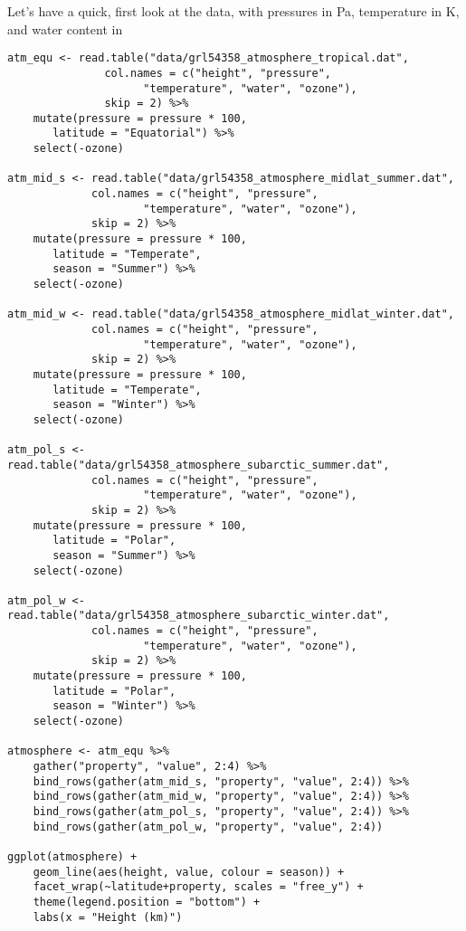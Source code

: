 \documentclass[10pt,a4paper,titlepage]{article}
\begin{document}
Let's have a quick, first look at the data, with pressures in Pa,
temperature in K, and water content in \gram\per\metre\cubed
{}
\begin{lstlisting}
atm_equ <- read.table("data/grl54358_atmosphere_tropical.dat",
		       col.names = c("height", "pressure",
				     "temperature", "water", "ozone"),
		       skip = 2) %>%
    mutate(pressure = pressure * 100,
	   latitude = "Equatorial") %>%
    select(-ozone)

atm_mid_s <- read.table("data/grl54358_atmosphere_midlat_summer.dat",
			 col.names = c("height", "pressure",
				     "temperature", "water", "ozone"),
			 skip = 2) %>%
    mutate(pressure = pressure * 100,
	   latitude = "Temperate",
	   season = "Summer") %>%
    select(-ozone)

atm_mid_w <- read.table("data/grl54358_atmosphere_midlat_winter.dat",
			 col.names = c("height", "pressure",
				     "temperature", "water", "ozone"),
			 skip = 2) %>%
    mutate(pressure = pressure * 100,
	   latitude = "Temperate",
	   season = "Winter") %>%
    select(-ozone)

atm_pol_s <- read.table("data/grl54358_atmosphere_subarctic_summer.dat",
			 col.names = c("height", "pressure",
				     "temperature", "water", "ozone"),
			 skip = 2) %>%
    mutate(pressure = pressure * 100,
	   latitude = "Polar",
	   season = "Summer") %>%
    select(-ozone)

atm_pol_w <- read.table("data/grl54358_atmosphere_subarctic_winter.dat",
			 col.names = c("height", "pressure",
				     "temperature", "water", "ozone"),
			 skip = 2) %>%
    mutate(pressure = pressure * 100,
	   latitude = "Polar",
	   season = "Winter") %>%
    select(-ozone)

atmosphere <- atm_equ %>%
    gather("property", "value", 2:4) %>%
    bind_rows(gather(atm_mid_s, "property", "value", 2:4)) %>%
    bind_rows(gather(atm_mid_w, "property", "value", 2:4)) %>%
    bind_rows(gather(atm_pol_s, "property", "value", 2:4)) %>%
    bind_rows(gather(atm_pol_w, "property", "value", 2:4))

ggplot(atmosphere) +
    geom_line(aes(height, value, colour = season)) +
    facet_wrap(~latitude+property, scales = "free_y") +
    theme(legend.position = "bottom") +
    labs(x = "Height (km)")
\end{lstlisting}
\end{document}
